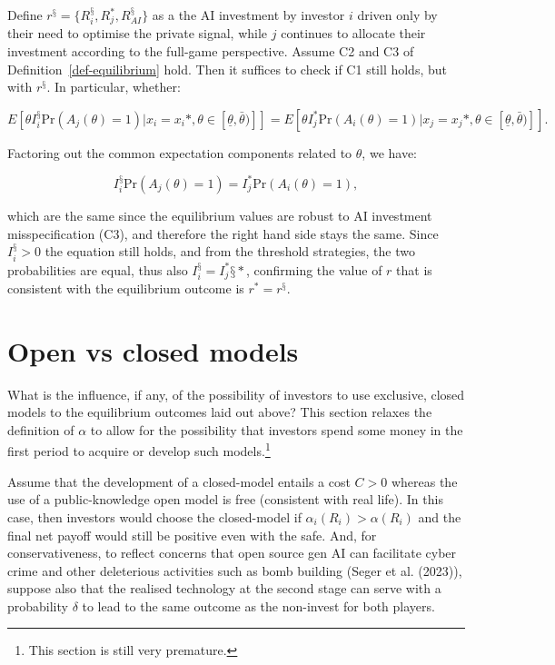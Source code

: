 \documentclass[
]{article}
\theoremstyle{plain}
\theoremstyle{definition}
\theoremstyle{remark}
\begin{document}
Define \(r^§ = \{R_i^§, R_j^*, R_{AI}^§\}\) as a the AI investment by
investor \(i\) driven only by their need to optimise the private signal,
while \(j\) continues to allocate their investment according to the
full-game perspective. Assume C2 and C3 of
Definition~\ref{def-equilibrium} hold. Then it suffices to check if C1
still holds, but with \(r^§\). In particular, whether:

\[
E[\theta I_i^§ \text{Pr}(A_j(\theta)=1) | x_i = x_i*, \theta \in [\underline{\theta}, \bar{\theta})]] = E[\theta I_j^* \text{Pr}(A_i(\theta)=1) | x_j = x_j*, \theta \in [\underline{\theta}, \bar{\theta})]].
\]

Factoring out the common expectation components related to \(\theta\),
we have:

\[
I_i^§ \text{Pr}(A_j(\theta)=1) = I_j^* \text{Pr}(A_i(\theta)=1),
\]

which are the same since the equilibrium values are robust to AI
investment misspecification (C3), and therefore the right hand side
stays the same. Since \(I_i^§ > 0\) the equation still holds, and from
the threshold strategies, the two probabilities are equal, thus also
\(I_i^§ = I_j^*§*\), confirming the value of \(r\) that is consistent
with the equilibrium outcome is \(r^* = r^§\).

\section{Open vs closed models}\label{sec-closedmodels}

What is the influence, if any, of the possibility of investors to use
exclusive, closed models to the equilibrium outcomes laid out above?
This section relaxes the definition of \(\alpha\) to allow for the
possibility that investors spend some money in the first period to
acquire or develop such models.\footnote{This section is still very
  premature.}

Assume that the development of a closed-model entails a cost \(C > 0\)
whereas the use of a public-knowledge open model is free (consistent
with real life). In this case, then investors would choose the
closed-model if \(\alpha_i(R_i) > \alpha(R_i)\) and the final net payoff
would still be positive even with the safe. And, for conservativeness,
to reflect concerns that open source gen AI can facilitate cyber crime
and other deleterious activities such as bomb building (Seger et al.
(2023)), suppose also that the realised technology at the second stage
can serve with a probability \(\delta\) to lead to the same outcome as
the non-invest for both players.
\end{document}
